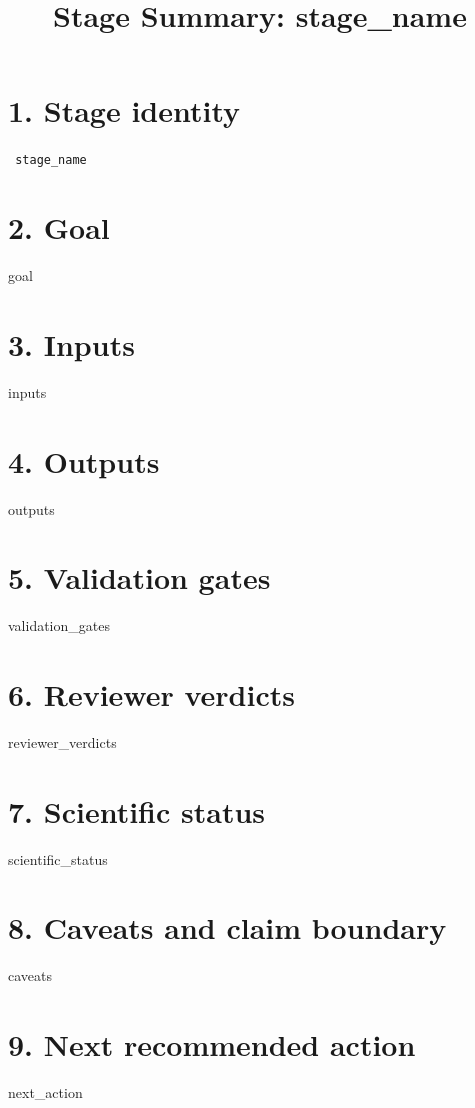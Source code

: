 \documentclass[11pt]{article}
\title{Stage Summary: {{ stage_name }}}
\date{}
\begin{document}
\maketitle

\section*{1. Stage identity}
\texttt{{{ stage_name }}}

\section*{2. Goal}
{{ goal }}

\section*{3. Inputs}
{{ inputs }}

\section*{4. Outputs}
{{ outputs }}

\section*{5. Validation gates}
{{ validation_gates }}

\section*{6. Reviewer verdicts}
{{ reviewer_verdicts }}

\section*{7. Scientific status}
{{ scientific_status }}

\section*{8. Caveats and claim boundary}
{{ caveats }}

\section*{9. Next recommended action}
{{ next_action }}
\end{document}
